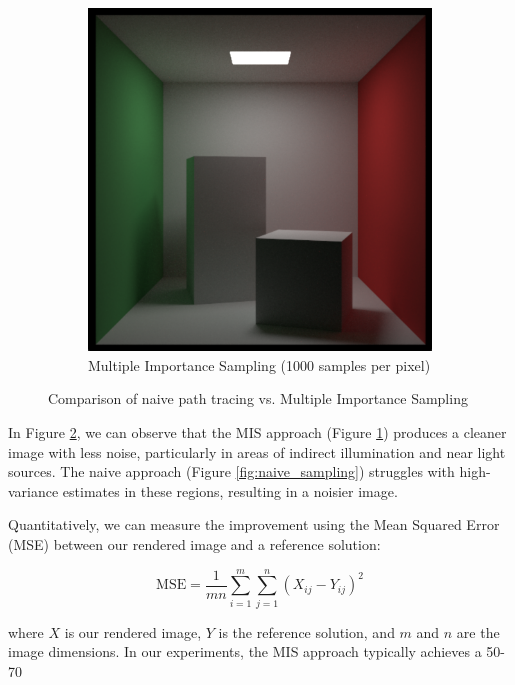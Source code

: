 \documentclass[12pt]{article}
\begin{document}
\begin{figure}[H]
\begin{subfigure}[b]{0.45\textwidth}
        \includegraphics[width=\textwidth]{images/cornell_box.png}
        \caption{Multiple Importance Sampling (1000 samples per pixel)}
        \label{fig:mis_sampling}
    \end{subfigure}
    \caption{Comparison of naive path tracing vs. Multiple Importance Sampling}
    \label{fig:sampling_comparison}
\end{figure}

In Figure \ref{fig:sampling_comparison}, we can observe that the MIS approach (Figure \ref{fig:mis_sampling}) produces a cleaner image with less noise, particularly in areas of indirect illumination and near light sources. The naive approach (Figure \ref{fig:naive_sampling}) struggles with high-variance estimates in these regions, resulting in a noisier image.

Quantitatively, we can measure the improvement using the Mean Squared Error (MSE) between our rendered image and a reference solution:

\[
    \text{MSE} = \frac{1}{mn} \sum_{i=1}^m \sum_{j=1}^n (X_{ij} - Y_{ij})^2
\]

where \( X \) is our rendered image, \( Y \) is the reference solution, and \( m \) and \( n \) are the image dimensions. In our experiments, the MIS approach typically achieves a 50-70%
\end{document}
